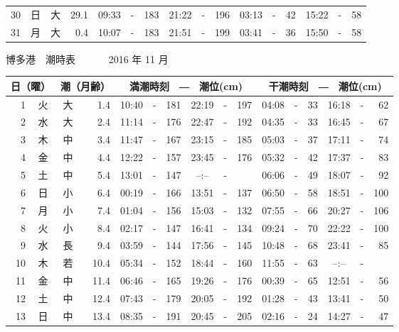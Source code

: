 \documentclass[12pt.a4j]{jsarticle}
\begin{document}
\begin{center}
\begin{table}[ht]
\begin{tabular}{|rc|cr|ccrccr|ccrccr|}
30 & 日 & 大 & 29.1 &  09:33 &-& 183  &  21:22 &-& 196  &   03:13 &-&  42  &   15:22 &-&  58  \\
31 & 月 & 大 &  0.4 &  10:07 &-& 183  &  21:51 &-& 199  &   03:41 &-&  36  &   15:50 &-&  58  \\
   \hline
   \end{tabular}
\end{table}
\newpage
 {\LARGE 博多港　潮時表　　　}
 {\large 2016 年 11 月}\\
 \begin{table}[ht]
    \begin{tabular}{|rc|cr|ccrccr|ccrccr|}
    \hline
    \multicolumn{2}{|c|}{日（曜）} & \multicolumn{2}{c|}{潮（月齢）} & \multicolumn{6}{c|}{満潮時刻　―　潮位(cm)} & \multicolumn{6}{c|}{干潮時刻　―　潮位(cm)} \\
 \hline
 1 & 火 & 大 &  1.4 &  10:40 &-& 181  &  22:19 &-& 197  &   04:08 &-&  33  &   16:18 &-&  62  \\
 2 & 水 & 大 &  2.4 &  11:14 &-& 176  &  22:47 &-& 192  &   04:35 &-&  33  &   16:45 &-&  67  \\
 3 & 木 & 中 &  3.4 &  11:47 &-& 167  &  23:15 &-& 185  &   05:03 &-&  37  &   17:11 &-&  74  \\
 4 & 金 & 中 &  4.4 &  12:22 &-& 157  &  23:45 &-& 176  &   05:32 &-&  42  &   17:37 &-&  83  \\
 5 & 土 & 中 &  5.4 &  13:01 &-& 147  &  --:-- &-&     &   06:06 &-&  49  &   18:07 &-&  92  \\
 6 & 日 & 小 &  6.4 &  00:19 &-& 166  &  13:51 &-& 137  &   06:50 &-&  58  &   18:51 &-& 100  \\
 7 & 月 & 小 &  7.4 &  01:04 &-& 156  &  15:03 &-& 132  &   07:55 &-&  66  &   20:27 &-& 106  \\
 8 & 火 & 小 &  8.4 &  02:17 &-& 147  &  16:41 &-& 134  &   09:24 &-&  70  &   22:22 &-& 100  \\
 9 & 水 & 長 &  9.4 &  03:59 &-& 144  &  17:56 &-& 145  &   10:48 &-&  68  &   23:41 &-&  85  \\
10 & 木 & 若 & 10.4 &  05:34 &-& 152  &  18:44 &-& 160  &   11:55 &-&  63  &   --:-- &-&     \\
11 & 金 & 中 & 11.4 &  06:46 &-& 165  &  19:26 &-& 176  &   00:39 &-&  65  &   12:51 &-&  56  \\
12 & 土 & 中 & 12.4 &  07:43 &-& 179  &  20:05 &-& 192  &   01:28 &-&  43  &   13:41 &-&  50  \\
13 & 日 & 中 & 13.4 &  08:35 &-& 191  &  20:45 &-& 205  &   02:16 &-&  24  &   14:27 &-&  47  \\

\end{tabular}
\end{table}
\end{center}
\end{document}
